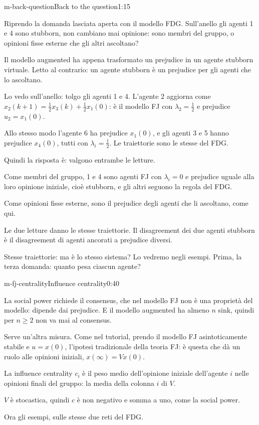 \begin{slidedue}{m-back-question}{Back to the question}{1:15}
  \begin{discorso}
    \item Riprendo la domanda lasciata aperta con il modello FDG. Sull'anello gli agenti 1 e 4 sono stubborn, non cambiano mai opinione: sono membri del gruppo, o opinioni fisse esterne che gli altri ascoltano?
    \item Il modello augmented ha appena trasformato un prejudice in un agente stubborn virtuale. Letto al contrario: un agente stubborn è un prejudice per gli agenti che lo ascoltano.
    \item Lo vedo sull'anello: tolgo gli agenti 1 e 4. L'agente 2 aggiorna come $x_2(k+1)=\tfrac12x_3(k)+\tfrac12x_1(0)$: è il modello FJ con $\lambda_2=\tfrac12$ e prejudice $u_2=x_1(0)$.
    \item Allo stesso modo l'agente 6 ha prejudice $x_1(0)$, e gli agenti 3 e 5 hanno prejudice $x_4(0)$, tutti con $\lambda_i=\tfrac12$. Le traiettorie sono le stesse del FDG.
    \item \clic Quindi la risposta è: valgono entrambe le letture.
    \item Come membri del gruppo, 1 e 4 sono agenti FJ con $\lambda_i=0$ e prejudice uguale alla loro opinione iniziale, cioè stubborn, e gli altri seguono la regola del FDG.
    \item Come opinioni fisse esterne, sono il prejudice degli agenti che li ascoltano, come qui.
    \item Le due letture danno le stesse traiettorie. Il disagreement dei due agenti stubborn è il disagreement di agenti ancorati a prejudice diversi.
    \item Stesse traiettorie: ma è lo stesso sistema? Lo vedremo negli esempi. Prima, la terza domanda: quanto pesa ciascun agente?
  \end{discorso}
\end{slidedue}

\begin{slide}{m-fj-centrality}{Influence centrality}{0:40}
  \begin{discorso}
    \item La social power richiede il consensus, che nel modello FJ non è una proprietà del modello: dipende dai prejudice. E il modello augmented ha almeno $n$ sink, quindi per $n\ge2$ non va mai al consensus.
    \item Serve un'altra misura. Come nel tutorial, prendo il modello FJ asintoticamente stabile e $u=x(0)$, l'ipotesi tradizionale della teoria FJ: è questa che dà un ruolo alle opinioni iniziali, $x(\infty)=Vx(0)$.
    \item La influence centrality $c_i$ è il peso medio dell'opinione iniziale dell'agente $i$ nelle opinioni finali del gruppo: la media della colonna $i$ di $V$.
    \item $V$ è stocastica, quindi $c$ è non negativo e somma a uno, come la social power.
    \item Ora gli esempi, sulle stesse due reti del FDG.
  \end{discorso}
\end{slide}

